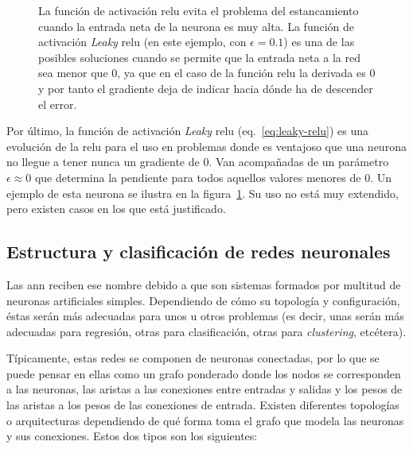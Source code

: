 \begin{figure}[t]
	\centering
	\qquad
	\caption[Funciones de activación: \acrshort{relu} y Leaky-\acrshort{relu}]{La función de activación \gls{relu} evita el problema del estancamiento cuando la entrada neta de la neurona es muy alta. La función de activación \textit{Leaky} \gls{relu} (en este ejemplo, con $\epsilon = 0.1$) es una de las posibles soluciones cuando se permite que la entrada neta a la red sea menor que $0$, ya que en el caso de la función \gls{relu} la derivada es $0$ y por tanto el gradiente deja de indicar hacia dónde ha de descender el error.}
	\label{fig:relu-and-leaky-relu}
\end{figure}

Por último, la función de activación \textit{Leaky} \gls{relu} (eq.~\ref{eq:leaky-relu}) es una evolución de la \gls{relu} para el uso en problemas donde es ventajoso que una neurona no llegue a tener nunca un gradiente de $0$. Van acompañadas de un parámetro $\epsilon \approx 0$ que determina la pendiente para todos aquellos valores menores de $0$. Un ejemplo de esta neurona se ilustra en la figura~\ref{fig:relu-and-leaky-relu}. Su uso no está muy extendido, pero existen casos en los que está justificado.

\subsection{Estructura y clasificación de redes neuronales}

Las \gls{ann} reciben ese nombre debido a que son sistemas formados por multitud de neuronas artificiales simples. Dependiendo de cómo su topología y configuración, éstas serán más adecuadas para unos u otros problemas (es decir, unas serán más adecuadas para regresión, otras para clasificación, otras para \textit{clustering}, etcétera).

Típicamente, estas redes se componen de neuronas conectadas, por lo que se puede pensar en ellas como un grafo ponderado donde los nodos se corresponden a las neuronas, las aristas a las conexiones entre entradas y salidas y los pesos de las aristas a los pesos de las conexiones de entrada. Existen diferentes topologías o arquitecturas dependiendo de qué forma toma el grafo que modela las neuronas y sus conexiones. Estos dos tipos son los siguientes:

